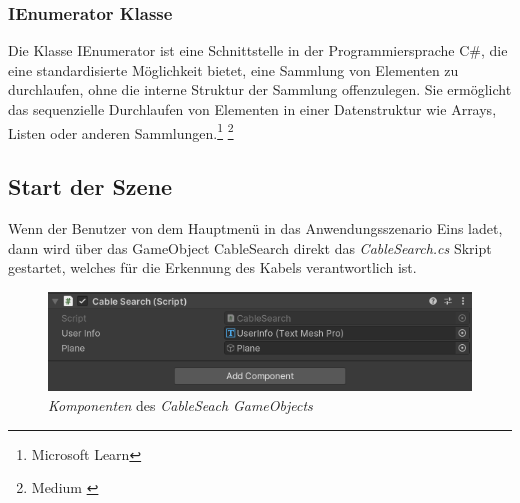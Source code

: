 \subsubsection{\label{sec:IEnumerator}IEnumerator Klasse}
Die Klasse IEnumerator ist eine Schnittstelle in der Programmiersprache C\#, die eine standardisierte Möglichkeit bietet, eine Sammlung von Elementen zu durchlaufen, ohne die interne Struktur der Sammlung offenzulegen. Sie ermöglicht das sequenzielle Durchlaufen von Elementen in einer Datenstruktur wie Arrays, Listen oder anderen Sammlungen.\protect\footnote{Microsoft Learn\cite{IEnumeratorMicrosoft}} \footnote{Medium \cite{IEnumeratorMedium}}


\subsection{Start der Szene}
Wenn der Benutzer von dem Hauptmenü in das Anwendungsszenario Eins ladet, dann wird über das GameObject CableSearch direkt das \textit{CableSearch.cs} Skript gestartet, welches für die Erkennung des Kabels verantwortlich ist.
\begin{figure}[H]
    \centering
    \includegraphics[scale=0.7]{images/CableSearchObjekt.png}
    \caption{\textit{Komponenten} des \textit{CableSeach} \textit{GameObjects}}
    \label{fig:CableSearchObjekt}
\end{figure}
